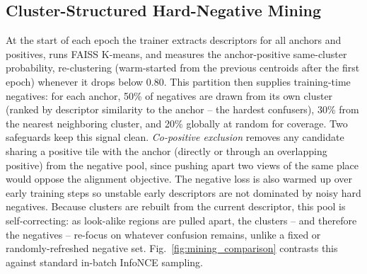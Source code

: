 \documentclass[conference]{IEEEtran}
\begin{document}
\subsection{Cluster-Structured Hard-Negative Mining}
\label{sec:hard_mining}
At the start of each epoch the trainer extracts descriptors for all
anchors and positives, runs FAISS K-means, and measures the
anchor-positive same-cluster probability, re-clustering (warm-started
from the previous centroids after the first epoch) whenever it drops
below 0.80. This partition then supplies training-time negatives: for
each anchor, 50\% of negatives are drawn from its own cluster (ranked by
descriptor similarity to the anchor -- the hardest confusers), 30\% from
the nearest neighboring cluster, and 20\% globally at random for
coverage. Two safeguards keep this signal clean. \emph{Co-positive
exclusion} removes any candidate sharing a positive tile with the anchor
(directly or through an overlapping positive) from the negative pool,
since pushing apart two views of the same place would oppose the
alignment objective. The negative loss is also warmed up over early
training steps so unstable early descriptors are not dominated by noisy
hard negatives. Because clusters are rebuilt from the current descriptor,
this pool is self-correcting: as look-alike regions are pulled apart, the
clusters -- and therefore the negatives -- re-focus on whatever confusion
remains, unlike a fixed or randomly-refreshed negative set.
Fig.~\ref{fig:mining_comparison} contrasts this against standard in-batch
InfoNCE sampling.
\end{document}
